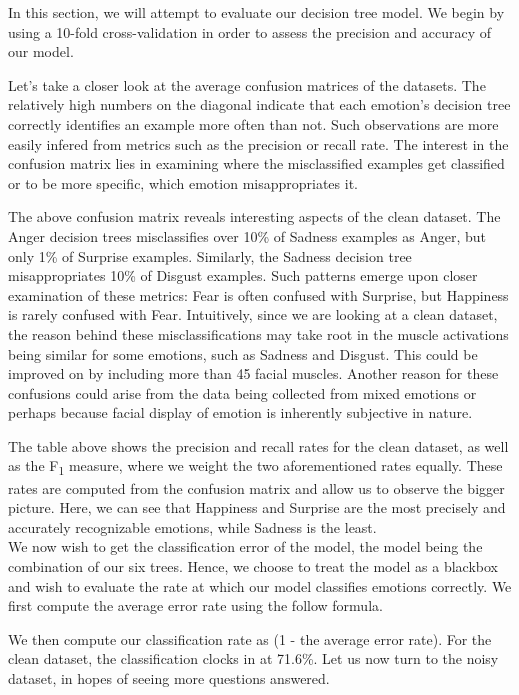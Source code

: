 In this section, we will attempt to evaluate our decision tree model. We begin by using a 10-fold cross-validation
in order to assess the precision and accuracy of our model. 

Let's take a closer look at the average confusion matrices of the datasets.
The relatively high numbers on the diagonal indicate that each emotion's decision tree correctly
identifies an example more often than not. Such observations are more easily infered from metrics such as the precision or recall rate.
The interest in the confusion matrix lies in examining where the misclassified examples get classified or to be more specific,
which emotion misappropriates it. 

\newpage


The above confusion matrix reveals interesting aspects of the clean dataset.
The Anger decision trees misclassifies over 10\% of Sadness examples as Anger, but only 1\% of Surprise examples.
Similarly, the Sadness decision tree misappropriates 10\% of Disgust examples.
Such patterns emerge upon closer examination of these metrics: Fear is often confused with Surprise, but Happiness is rarely confused with Fear.
Intuitively, since we are looking at a clean dataset,
the reason behind these misclassifications may take root in the muscle activations being similar for some emotions, such as Sadness and Disgust.
This could be improved on by including  more than 45 facial muscles.
Another reason for these confusions could arise from the data being collected from mixed emotions or perhaps because facial display
of emotion is inherently subjective in nature.



The table above shows the precision and recall rates for the clean dataset, as well as the F\textsubscript{1} measure,
where we weight the two aforementioned rates equally. These rates are computed from the confusion matrix and allow us to
observe the bigger picture. Here, we can see that Happiness and Surprise are the most precisely and accurately recognizable
emotions, while Sadness is the least. \\



We now wish to get the classification error of the model, the model being the combination of our six trees.
Hence, we choose to treat the model as a blackbox and wish to evaluate the rate at which our model classifies emotions correctly.
We first compute the average error rate using the follow formula.

We then compute our classification rate as (1 - the average error rate).
For the clean dataset, the classification clocks in at 71.6\%.
Let us now turn to the noisy dataset, in hopes of seeing more questions answered.

